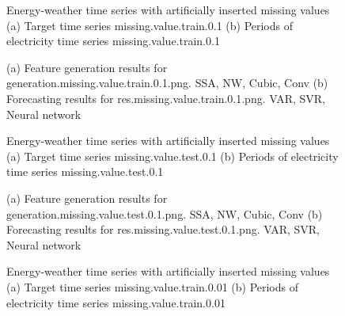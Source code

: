 \documentclass[12pt]{article}
\begin{document}
\begin{figure}
\centering
{}
\caption{Energy-weather time series with artificially inserted missing values	(a) Target time series	missing.value.train.0.1	(b) Periods of electricity time series	missing.value.train.0.1	}
\end{figure}


\begin{figure}
\centering
{}
\caption{(a)	Feature generation results for	generation.missing.value.train.0.1.png.	SSA, NW, Cubic, Conv	(b)	Forecasting results for	res.missing.value.train.0.1.png.	VAR, SVR, Neural network	}
\end{figure}


\begin{figure}
\centering
{}
\caption{Energy-weather time series with artificially inserted missing values	(a) Target time series	missing.value.test.0.1	(b) Periods of electricity time series	missing.value.test.0.1	}
\end{figure}


\begin{figure}
\centering
{}
\caption{(a)	Feature generation results for	generation.missing.value.test.0.1.png.	SSA, NW, Cubic, Conv	(b)	Forecasting results for	res.missing.value.test.0.1.png.	VAR, SVR, Neural network	}
\end{figure}


\begin{figure}
\centering
{}
\caption{Energy-weather time series with artificially inserted missing values	(a) Target time series	missing.value.train.0.01	(b) Periods of electricity time series	missing.value.train.0.01	}
\end{figure}
\end{document}
